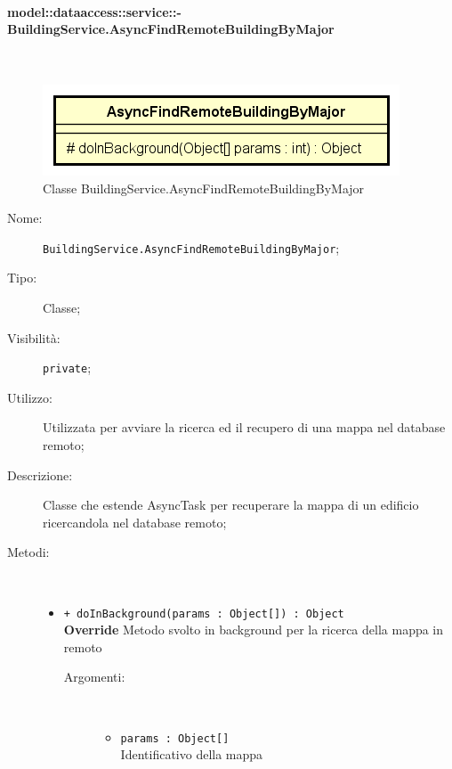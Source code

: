 \documentclass[../DefinizioneDiProdotto.tex]{subfiles}
\begin{document}
\paragraph{model::dataaccess::service::-\\BuildingService.AsyncFindRemoteBuildingByMajor}
\
\begin{figure}[H]
	\centering
	\includegraphics[width=\maxwidth]{img/BuildingService-AsyncFindRemoteBuildingByMajor.png}
	\caption{Classe BuildingService.AsyncFindRemoteBuildingByMajor}\label{fig:model::dataaccess::service::BuildingService.AsyncFindRemoteBuildingByMajor} 
\end{figure}
\begin{description}
	\item[Nome:] \texttt{BuildingService.AsyncFindRemoteBuildingByMajor};
	\item[Tipo:] Classe;
	\item[Visibilità:] \texttt{private};
	\item[Utilizzo:] Utilizzata per avviare la ricerca ed il recupero di una mappa nel database remoto;
	\item[Descrizione:] Classe che estende AsyncTask per recuperare la mappa di un edificio ricercandola nel database remoto;
	\item[Metodi:] \
	\begin{itemize}
		\item \texttt{+ doInBackground(params : Object[]) : Object}\\
		\textbf{Override} Metodo svolto in background per la ricerca della mappa in remoto
		\begin{description}
			\item[Argomenti:] \
			\begin{itemize}
				\item \texttt{params : Object[]}\\
				Identificativo della mappa\end{itemize}
		\end{description}
	\end{itemize}
\end{description}
\end{document}
